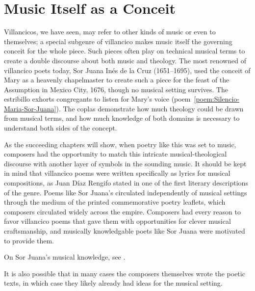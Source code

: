 \section{Music Itself as a Conceit}

Villancicos, we have seen, may refer to other kinds of music or even to themselves; a special subgenre of villancico makes music itself the governing conceit for the whole piece.
Such pieces often play on technical musical terms to create a double discourse about both music and theology.
The most renowned of villancico poets today, Sor Juana Inés de la Cruz (1651--1695), used the conceit of Mary as a heavenly chapelmaster to create such a piece for the feast of the Assumption in Mexico City, 1676, though no musical setting survives.%
    \autocite[no.~220, p.~7]{SorJuana:VC}
The estribillo exhorts congregants to listen for Mary's voice (poem~\ref{poem:Silencio-Maria-Sor-Juana}).
The coplas demonstrate how much theology could be drawn from musical terms, and how much knowledge of both domains is necessary to understand both sides of the concept.

%	

As the succeeding chapters will show, when poetry like this was set to music, composers had the opportunity to match this intricate musical-theological discourse with another layer of symbols in the sounding music.
It should be kept in mind that villancico poems were written specifically as lyrics for musical compositions, as Juan Díaz Rengifo stated in one of the first literary descriptions of the genre.
    \autocite{Rengifo:ArteMetrica}
Poems like Sor Juana's circulated independently of musical settings through the medium of the printed commemorative poetry leaflets, which composers circulated widely across the empire.
Composers had every reason to favor villancico poems that gave them with opportunities for clever musical craftsmanship, and musically knowledgable poets like Sor Juana were motivated to provide them.%
\begin{Footnote}
On Sor Juana's musical knowledge, see \autocite{Stevenson:SorJuanaMusicalRapports}.
\end{Footnote}
It is also possible that in many cases the composers themselves wrote the poetic texts, in which case they likely already had ideas for the musical setting.

